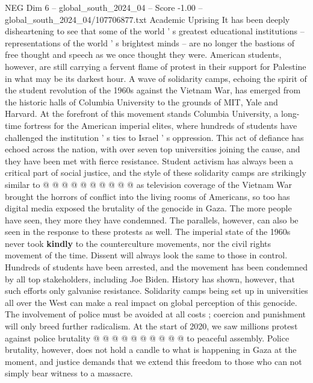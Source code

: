 \begin{textsample}{NEG Dim 6 – global\_south\_2024\_04 – Score -1.00 – global\_south\_2024\_04/107706877.txt}  \label{ex:f6_neg_330}
Academic Uprising It has been deeply disheartening to see that some of the world ' s greatest educational institutions -- representations of the world ' s brightest minds -- are no longer the bastions of free thought and speech as we once thought they were.
American students, however, are still carrying a fervent flame of protest in their support for Palestine in what may be its darkest hour.
A wave of solidarity camps, echoing the spirit of the student revolution of the 1960s against the Vietnam War, has emerged from the historic halls of Columbia University to the grounds of MIT, Yale and Harvard.
At the forefront of this movement stands Columbia University, a long-time fortress for the American imperial elites, where hundreds of students have challenged the institution ' s ties to Israel ' s oppression.
This act of defiance has echoed across the nation, with over seven top universities joining the cause, and they have been met with fierce resistance.
Student activism has always been a critical part of social justice, and the style of these solidarity camps are strikingly similar to @ @ @ @ @ @ @ @ @ @ as television coverage of the Vietnam War brought the horrors of conflict into the living rooms of Americans, so too has digital media exposed the brutality of the genocide in Gaza.
The more people have seen, they more they have condemned.
The parallels, however, can also be seen in the response to these protests as well.
The imperial state of the 1960s never took \textbf{kindly} to the counterculture movements, nor the civil rights movement of the time.
Dissent will always look the same to those in control.
Hundreds of students have been arrested, and the movement has been condemned by all top stakeholders, including Joe Biden.
History has shown, however, that such efforts only galvanise resistance.
Solidarity camps being set up in universities all over the West can make a real impact on global perception of this genocide.
The involvement of police must be avoided at all costs ; coercion and punishment will only breed further radicalism.
At the start of 2020, we saw millions protest against police brutality @ @ @ @ @ @ @ @ @ @ to peaceful assembly.
Police brutality, however, does not hold a candle to what is happening in Gaza at the moment, and justice demands that we extend this freedom to those who can not simply bear witness to a massacre.

\end{textsample}
